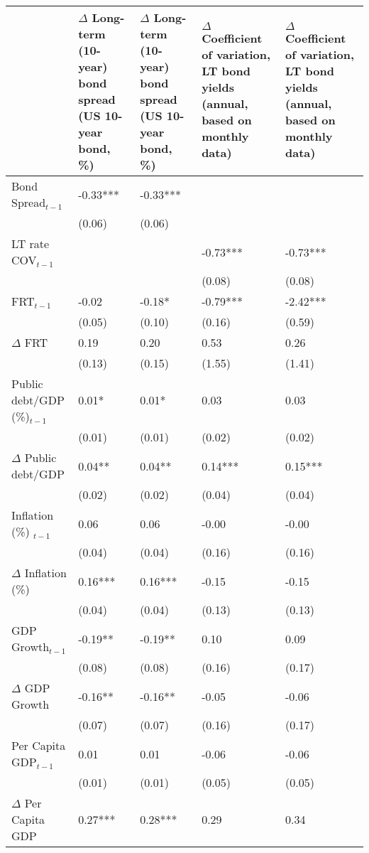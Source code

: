 \begingroup\tiny
\begin{tabular}{lp{3cm}p{3cm}p{3cm}p{3cm}}
  \hline
 & $\Delta$ Long-term (10-year) bond spread (US 10-year bond, \%) & $\Delta$ Long-term (10-year) bond spread (US 10-year bond, \%) & $\Delta$ Coefficient of variation, LT bond yields (annual, based on monthly data) & $\Delta$ Coefficient of variation, LT bond yields (annual, based on monthly data) \\ 
  \hline
Bond Spread$_{t-1}$ & -0.33*** & -0.33*** &  &  \\ 
   & (0.06) & (0.06) &  &  \\ 
  LT rate COV$_{t-1}$ &  &  & -0.73*** & -0.73*** \\ 
   &  &  & (0.08) & (0.08) \\ 
  FRT$_{t-1}$ & -0.02 & -0.18* & -0.79*** & -2.42*** \\ 
   & (0.05) & (0.10) & (0.16) & (0.59) \\ 
  $\Delta$ FRT & 0.19 & 0.20 & 0.53 & 0.26 \\ 
   & (0.13) & (0.15) & (1.55) & (1.41) \\ 
  Public debt/GDP (\%)$_{t-1}$ & 0.01* & 0.01* & 0.03 & 0.03 \\ 
   & (0.01) & (0.01) & (0.02) & (0.02) \\ 
  $\Delta$ Public debt/GDP & 0.04** & 0.04** & 0.14*** & 0.15*** \\ 
   & (0.02) & (0.02) & (0.04) & (0.04) \\ 
  Inflation (\%) $_{t-1}$ & 0.06 & 0.06 & -0.00 & -0.00 \\ 
   & (0.04) & (0.04) & (0.16) & (0.16) \\ 
  $\Delta$ Inflation (\%) & 0.16*** & 0.16*** & -0.15 & -0.15 \\ 
   & (0.04) & (0.04) & (0.13) & (0.13) \\ 
  GDP Growth$_{t-1}$ & -0.19** & -0.19** & 0.10 & 0.09 \\ 
   & (0.08) & (0.08) & (0.16) & (0.17) \\ 
  $\Delta$ GDP Growth & -0.16** & -0.16** & -0.05 & -0.06 \\ 
   & (0.07) & (0.07) & (0.16) & (0.17) \\ 
  Per Capita GDP$_{t-1}$ & 0.01 & 0.01 & -0.06 & -0.06 \\ 
   & (0.01) & (0.01) & (0.05) & (0.05) \\ 
  $\Delta$ Per Capita GDP & 0.27*** & 0.28*** & 0.29 & 0.34 \\ 

\end{tabular}
